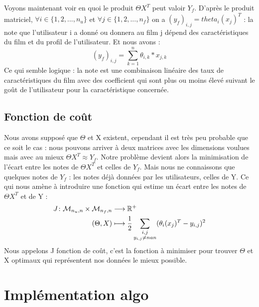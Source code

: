 \documentclass[a4paper,10pt]{article}
\begin{document}
Voyons maintenant voir en quoi le produit $\Theta X^T$ peut valoir $Y_f$. D'après le produit matriciel, $\forall i \in \{1, 2, ..., n_u\}$ et $\forall j \in \{1, 2, ..., n_f\}$ on a $(y_{f})_{i,j} = theta_{i}(x_{j})^{T}$ : la note que l'utilisateur i a donné ou donnera au film j dépend des caractéristiques du film et du profil de l'utilisateur. Et nous avons :
\[(y_{f})_{i,j} = \sum_{k = 1}^{n} \theta_{i,k} * x_{j,k}\]
Ce qui semble logique : la note est une combinaison linéaire des taux de caractéristiques du film avec des coefficient qui sont plus ou moins élevé suivant le goût de l'utilisateur pour la caractéristique concernée.

\subsection{Fonction de coût}

Nous avons supposé que $\Theta$ et X existent, cependant il est très peu probable que ce soit le cas : nous pouvons arriver à deux matrices avec les dimensions voulues mais avec au mieux $\Theta X^T \approx Y_f$. Notre problème devient alors la minimisation de l'écart entre les notes de $\Theta X^T$ et celles de $Y_f$. Mais nous ne connaissons que quelques notes de $Y_f$ : les notes déjà données par les utilisateurs, celles de Y. Ce qui nous amène à introduire une fonction qui estime un écart entre les notes de $\Theta X^T$ et de Y :
\begin{align*}
J\colon{\cal M}_{n_u, n} \times {\cal M}_{n_f, n} &\longrightarrow \mathbb{R}^+\\
(\Theta, X)&\longmapsto \frac{1}{2}\sum_{\substack{i,j \\ y_{i,j} \ne nan}}(\theta_{i}(x_{j})^{T}-y_{i,j})^{2}
\end{align*}
Nous appelons J fonction de coût, c'est la fonction à minimiser pour trouver $\Theta$ et X optimaux qui représentent nos données le mieux possible.

\section{Implémentation algo}
\end{document}
